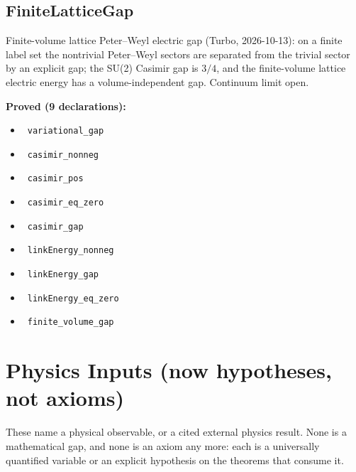 \documentclass{report}
\theoremstyle{definition}
\begin{document}
\begin{itemize}
\begin{itemize}
\subsection{FiniteLatticeGap}
Finite-volume lattice Peter--Weyl electric gap (Turbo, 2026-10-13): on a finite
label set the nontrivial Peter--Weyl sectors are separated from the trivial
sector by an explicit gap; the SU(2) Casimir gap is $3/4$, and the finite-volume
lattice electric energy has a volume-independent gap. Continuum limit open.

\noindent\textbf{Proved (9 declarations):}
\begin{itemize}
  \item {}\leanok\ \texttt{variational\_gap}
  \item {}\leanok\ \texttt{casimir\_nonneg}
  \item {}\leanok\ \texttt{casimir\_pos}
  \item {}\leanok\ \texttt{casimir\_eq\_zero}
  \item {}\leanok\ \texttt{casimir\_gap}
  \item {}\leanok\ \texttt{linkEnergy\_nonneg}
  \item {}\leanok\ \texttt{linkEnergy\_gap}
  \item {}\leanok\ \texttt{linkEnergy\_eq\_zero}
  \item {}\leanok\ \texttt{finite\_volume\_gap}
\end{itemize}

\section{Physics Inputs (now hypotheses, not axioms)}

These name a physical observable, or a cited external physics result. None is a mathematical
gap, and none is an axiom any more: each is a universally quantified variable or an explicit
hypothesis on the theorems that consume it.


\end{itemize}
\end{itemize}
\end{document}
